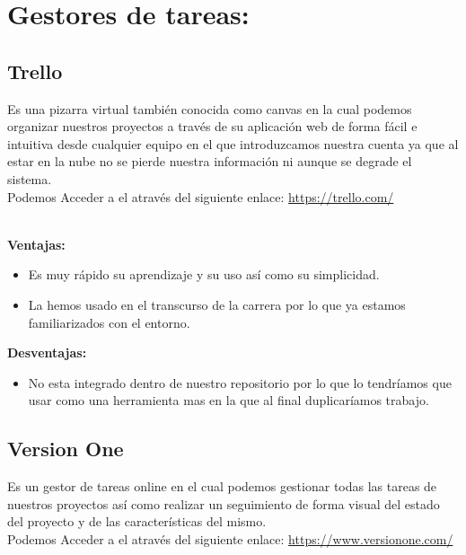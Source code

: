 


\section{Gestores de tareas:}
\subsection{Trello}
Es una pizarra virtual también conocida como canvas en la cual podemos organizar nuestros proyectos a través de su aplicación web de forma fácil e intuitiva desde cualquier equipo en el que introduzcamos nuestra cuenta ya que al estar en la nube no se pierde nuestra información ni aunque se degrade el sistema.\\
Podemos Acceder a el através del siguiente enlace: 
\url{https://trello.com/}

\\

\textbf{Ventajas:}

\begin{itemize}
\item Es muy rápido su aprendizaje y su uso así como su simplicidad.

\item La hemos usado en el transcurso de la carrera por lo que ya estamos familiarizados con el entorno.
\end{itemize}

\textbf{Desventajas:}

\begin{itemize}
\item No esta integrado dentro de nuestro repositorio por lo que lo tendríamos que usar como una herramienta mas en la que al final duplicaríamos trabajo.
\end{itemize}


\subsection{Version One}
Es un gestor de tareas online en el cual podemos gestionar todas las tareas de nuestros proyectos así como realizar un seguimiento de forma visual del estado del proyecto y de las características del mismo.\\ 
Podemos Acceder a el através del siguiente enlace: 
\url{https://www.versionone.com/}


